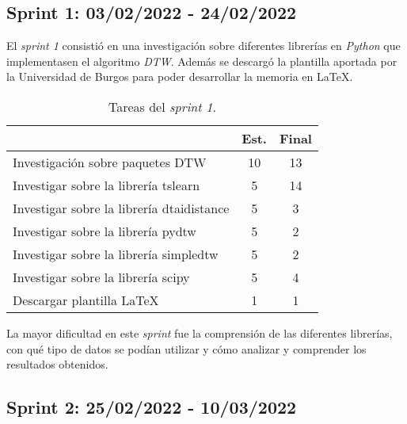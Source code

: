 \subsection{Sprint 1: 03/02/2022 - 24/02/2022}

El \textit{sprint 1} consistió en una investigación sobre diferentes librerías en \textit{Python} que implementasen el algoritmo \textit{DTW}. Además se descargó la plantilla aportada por la Universidad de Burgos para poder desarrollar la memoria en \LaTeX.

\begin{table}[H]
\centering
\begin{tabular}{lcc}
\hline
\rowcolor[HTML]{EFEFEF} 
\multicolumn{1}{c}{\cellcolor[HTML]{EFEFEF}\textbf{Tareas}} & \textbf{Est.} & \textbf{Final} \\ \hline
\rowcolor[HTML]{ECF4FF} 
Investigación sobre paquetes DTW                            & 10            & 13             \\
\rowcolor[HTML]{EFEFEF} 
Investigar sobre la librería tslearn                        & 5             & 14             \\
\rowcolor[HTML]{ECF4FF} 
Investigar sobre la librería dtaidistance                   & 5             & 3              \\
\rowcolor[HTML]{EFEFEF} 
Investigar sobre la librería pydtw                          & 5             & 2              \\
\rowcolor[HTML]{ECF4FF} 
Investigar sobre la librería simpledtw                      & 5             & 2              \\
\rowcolor[HTML]{EFEFEF} 
Investigar sobre la librería scipy                          & 5             & 4              \\
\rowcolor[HTML]{ECF4FF} 
Descargar plantilla \LaTeX                                   & 1             & 1              \\ \hline
\end{tabular}
\caption{Tareas del \textit{sprint 1}.}
\label{sprint1}
\end{table}

La mayor dificultad en este \textit{sprint} fue la comprensión de las diferentes librerías, con qué tipo de datos se podían utilizar y cómo analizar y comprender los resultados obtenidos.  

\subsection{Sprint 2: 25/02/2022 - 10/03/2022}

